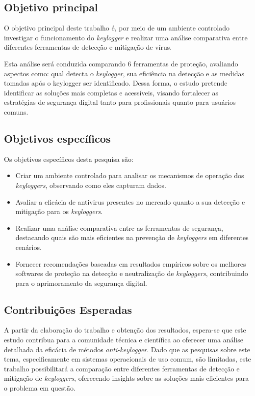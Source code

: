 \documentclass[12pt]{article}
\begin{document}
\subsection{Objetivo principal}
O objetivo principal deste trabalho é, por meio de um ambiente controlado 
investigar o funcionamento do \textit{keylogger} 
e realizar uma análise comparativa entre diferentes ferramentas de detecção e mitigação de vírus.

Esta análise será conduzida comparando 6 ferramentas de proteção, 
avaliando aspectos como: qual detecta o \textit{keylogger}, 
sua eficiência na detecção e as medidas tomadas após o keylogger ser identificado. Dessa forma, 
o estudo pretende identificar as soluções mais completas e acessíveis, visando fortalecer 
as estratégias de segurança digital tanto para profissionais quanto para usuários comuns.

\subsection{Objetivos específicos}

Os objetivos específicos desta pesquisa são:
\begin{itemize}
    \item Criar um ambiente controlado para analisar os mecanismos de operação dos \textit{keyloggers}, observando como eles capturam dados.
    \item Avaliar a eficácia de antivirus presentes no mercado quanto a sua detecção e mitigação para os \textit{keyloggers}.
    \item Realizar uma análise comparativa entre as ferramentas de segurança, destacando quais são mais eficientes na prevenção de \textit{keyloggers} em diferentes cenários.
    \item Fornecer recomendações baseadas em resultados empíricos sobre os melhores softwares de proteção 
    na detecção e neutralização de \textit{keyloggers}, contribuindo para o aprimoramento da segurança digital.
\end{itemize}

\subsection{Contribuições Esperadas}
A partir da elaboração do trabalho e obtenção dos resultados, espera-se que este estudo contribua para a comunidade técnica e científica ao oferecer uma análise detalhada da eficácia de métodos \textit{anti-keylogger}. Dado que as pesquisas sobre este tema, especificamente em sistemas operacionais de uso comum, são limitadas, este trabalho possibilitará a comparação entre diferentes ferramentas de detecção e mitigação de \textit{keyloggers}, oferecendo insights sobre as soluções mais eficientes para o problema em questão.
\end{document}
